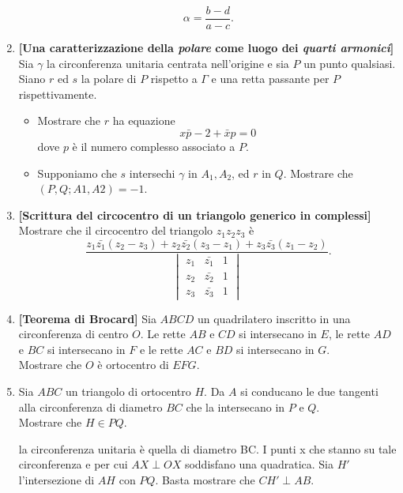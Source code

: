 \begin{enumerate}
	$$
	\alpha=\frac{b-d}{a-c}.
	$$
	\item \textbf{[Una caratterizzazione della \textit{polare} come luogo dei \emph{quarti armonici}]} Sia $\gamma$ la circonferenza unitaria centrata nell'origine e sia $P$ un punto qualsiasi. Siano $r$ ed $s$ la polare di $P$ rispetto a $\Gamma$ e una retta passante per $P$ rispettivamente. 
		\begin{itemize}
		\item Mostrare che $r$ ha equazione
			\begin{equation}
			x\bar{p}-2+\bar{x}p=0
			\end{equation}
			dove $p$ è il numero complesso associato a $P$.
		\item  Supponiamo che $s$ intersechi $\gamma$ in $A_1, A_2$, ed $r$ in $Q$. Mostrare che $(P,Q;A1,A2)=-1$.
		\end{itemize}
	\item \textbf{[Scrittura del circocentro di un triangolo generico in complessi]} Mostrare che il circocentro del triangolo $z_1z_2z_3$ è
		\begin{equation}
		\frac{z_1\bar{z_1}(z_2-z_3)+z_2\bar{z_2}(z_3-z_1)+z_3\bar{z_3}(z_1-z_2)}{\begin{vmatrix}
			z_1 & \bar{z_1} & 1 \\
			z_2 & \bar{z_2} & 1 \\
			z_3 & \bar{z_3} & 1 
			\end{vmatrix}}.
		\end{equation}
	\item \textbf{[Teorema di Brocard]} Sia $ABCD$ un quadrilatero inscritto in una circonferenza di centro $O$. Le rette $AB$ e $CD$ si intersecano in $E$, le rette $AD$ e $BC$ si intersecano in $F$ e le rette $AC$ e $BD$ si intersecano in $G$. \\
	Mostrare che $O$ è ortocentro di $EFG$.
	
	\item Sia $ABC$ un triangolo di ortocentro $H$. Da $A$ si conducano le due tangenti alla circonferenza di diametro $BC$ che la intersecano in $P$ e $Q$. \\
	Mostrare che $H\in PQ$.
	
	\begin{sol} la circonferenza unitaria è quella di diametro BC.
	I punti x che stanno su tale circonferenza e per cui $AX \perp OX$ soddisfano una quadratica. Sia $H'$ l'intersezione di $AH$ con $PQ$. Basta mostrare che $CH' \perp AB.$
	\end{sol}
	

\end{enumerate}
